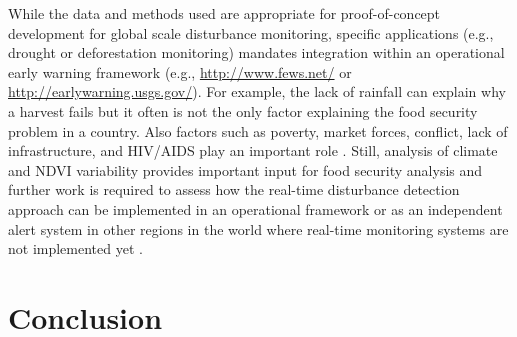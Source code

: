\documentclass[authoryear,preprint,review,10pt]{elsarticle}
\begin{document}
\begin{enumerate}[(1)]

\end{enumerate}

While the data and methods used are appropriate for proof-of-concept development for global scale disturbance monitoring, specific applications (e.g., drought or deforestation monitoring) mandates integration within an operational early warning framework (e.g., \url{http://www.fews.net/} or \url{http://earlywarning.usgs.gov/}). For example, the lack of rainfall can explain why a harvest fails but it often is not the only factor explaining the food security problem in a country.  Also factors such as poverty, market forces, conflict, lack of infrastructure, and HIV/AIDS play an important role \citep{Funk:2011fg, Vrieling:2011da}. Still, analysis of climate and NDVI variability provides important input for food security analysis and further work is required to assess how the real-time disturbance detection approach can be implemented in an operational framework or as an independent alert system in other regions in the world where real-time monitoring systems are not implemented yet \citep{Asner:2011fa}. 

\section{Conclusion}
\end{document}

